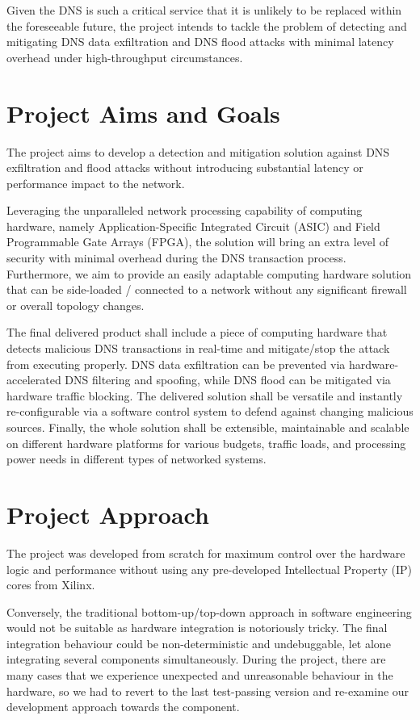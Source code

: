 \documentclass[a4paper]{report}
\begin{document}
Given the DNS is such a critical service that it is unlikely to be replaced within the foreseeable future, the project intends to tackle the problem of detecting and mitigating DNS data exfiltration and DNS flood attacks with minimal latency overhead under high-throughput circumstances.

\section{Project Aims and Goals}

The project aims to develop a detection and mitigation solution against DNS exfiltration and flood attacks without introducing substantial latency or performance impact to the network.

Leveraging the unparalleled network processing capability of computing hardware, namely Application-Specific Integrated Circuit (ASIC) and Field Programmable Gate Arrays (FPGA), the solution will bring an extra level of security with minimal overhead during the DNS transaction process. Furthermore, we aim to provide an easily adaptable computing hardware solution that can be side-loaded / connected to a network without any significant firewall or overall topology changes.

The final delivered product shall include a piece of computing hardware that detects malicious DNS transactions in real-time and mitigate/stop the attack from executing properly. DNS data exfiltration can be prevented via hardware-accelerated DNS filtering and spoofing, while DNS flood can be mitigated via hardware traffic blocking. The delivered solution shall be versatile and instantly re-configurable via a software control system to defend against changing malicious sources. Finally, the whole solution shall be extensible, maintainable and scalable on different hardware platforms for various budgets, traffic loads, and processing power needs in different types of networked systems.

\section{Project Approach}

The project was developed from scratch for maximum control over the hardware logic and performance without using any pre-developed Intellectual Property (IP) cores from Xilinx.

Conversely, the traditional bottom-up/top-down approach in software engineering would not be suitable as hardware integration is notoriously tricky. The final integration behaviour could be non-deterministic and undebuggable, let alone integrating several components simultaneously. During the project, there are many cases that we experience unexpected and unreasonable behaviour in the hardware, so we had to revert to the last test-passing version and re-examine our development approach towards the component.
\end{document}
